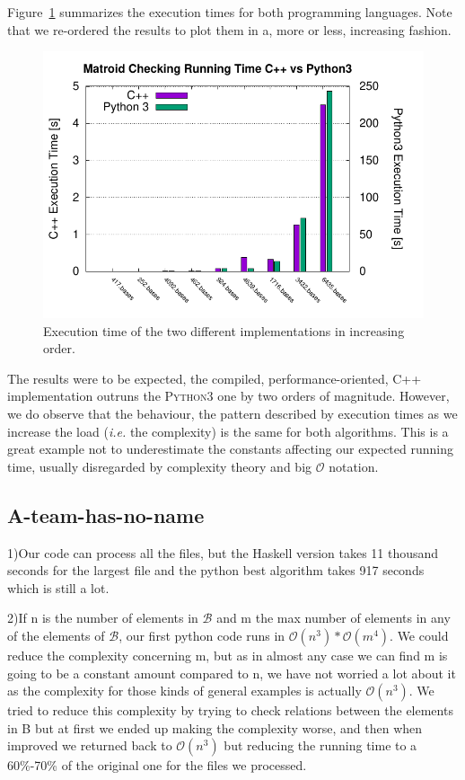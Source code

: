 \documentclass[11pt]{amsart}
\begin{document}
Figure~\ref{fig:team-bearland-times} summarizes the execution times for both programming languages.
Note that we re-ordered the results to plot them in a, more or less, increasing fashion. 
\begin{figure}[h!]
    \centering
    \includegraphics[width=.7\textwidth]{./team-berland/exec_time.pdf}
    \caption{Execution time of the two different implementations in increasing order.\label{fig:team-bearland-times}}
\end{figure}
The results were to be expected, the compiled, performance-oriented, \textsc{C++} implementation outruns the \textsc{Python3} one by two orders of magnitude.
However, we do observe that the behaviour, the pattern described by execution times as we increase the load (\textit{i.e.} the complexity) is the same for both algorithms.
This is a great example not to underestimate the constants affecting our expected running time, usually disregarded by complexity theory and big $\mathcal{O}$ notation.

\subsection{A-team-has-no-name}

1)Our code can process all the files, but the Haskell version takes 11 thousand seconds for the largest file and the python best algorithm takes 917 seconds which is still a lot.

2)If n is the number of elements in $\mathcal{B}$ and m the max number of elements in any of the elements of $\mathcal{B}$, our first python code runs in $\mathcal{O}(n^3)*\mathcal{O}(m^4)$.
We could reduce the complexity concerning m, but as in almost any case we can find m is going to be a constant amount compared to n, we have not worried a lot about it as the complexity for those kinds of general examples is actually $\mathcal{O}(n^3)$.
We tried to reduce this complexity by trying to check relations between the elements in B but at first we ended up making the complexity worse, and then when improved we returned back to $\mathcal{O}(n^3)$ but reducing the running time to a 60\%-70\% of the original one for the files we processed.
\end{document}
